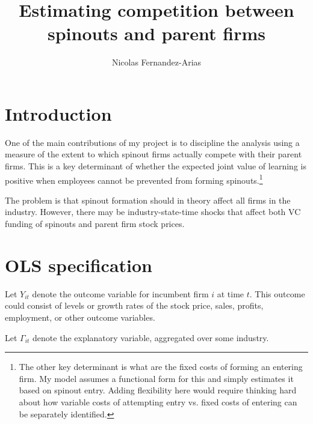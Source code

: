 \documentclass[12pt,english]{article}
\theoremstyle{remark}
\begin{document}
	
\title{Estimating competition between spinouts and parent firms}
\author{Nicolas Fernandez-Arias}
\maketitle

\section{Introduction}

One of the main contributions of my project is to discipline the analysis using a measure of the extent to which spinout firms actually compete with their parent firms. This is a key determinant of whether the expected joint value of learning is positive when employees cannot be prevented from forming spinouts.\footnote{The other key determinant is what are the fixed costs of forming an entering firm. My model assumes a functional form for this and simply estimates it based on spinout entry. Adding flexibility here would require thinking hard about how variable costs of attempting entry vs. fixed costs of entering can be separately identified.}

The problem is that spinout formation should in theory affect all firms in the industry. However, there may be industry-state-time shocks that affect both VC funding of spinouts and parent firm stock prices. 

\section{OLS specification}

Let $Y_{it}$ denote the outcome variable for incumbent firm $i$ at time $t$. This outcome could consist of levels or growth rates of the stock price, sales, profits, employment, or other outcome variables. 

Let $\Gamma_{it}$ denote the explanatory variable, aggregated over some industry. 
\end{document}
